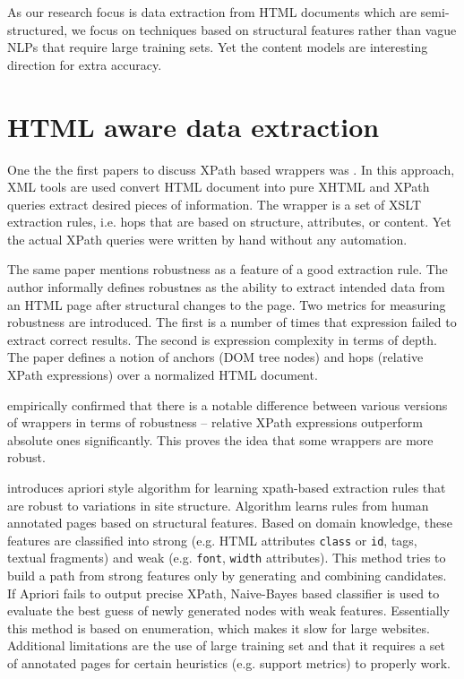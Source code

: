 As our research focus is data extraction from HTML documents which are semi-structured, we focus on techniques based on structural features rather than vague NLPs that require large training sets. Yet the content models are interesting direction for extra accuracy.


\section{HTML aware data extraction}

One the the first papers to discuss XPath based wrappers was \cite{Myllymaki02robustweb}. In this approach, XML tools are used convert HTML document into pure XHTML and XPath queries extract desired pieces of information. The wrapper is a set of XSLT extraction rules, i.e. hops that are based on structure, attributes, or content. Yet the actual XPath queries were written by hand without any automation.

The same paper mentions robustness as a feature of a good extraction rule. The author informally defines robustnes as the ability to extract intended data from an HTML page after structural changes to the page. Two metrics for measuring robustness are introduced. The first is a number of times that expression failed to extract correct results. The second is expression complexity in terms of depth. The paper defines a notion of anchors (DOM tree nodes) and hops (relative XPath expressions) over a normalized HTML document. 

\cite{Kowalkiewicz:2006:RWC:1135777.1135928} empirically confirmed that there is a notable difference between various versions of wrappers in terms of robustness – relative XPath expressions outperform absolute ones significantly. This proves the idea that some wrappers are more robust.

\cite{DBLP:conf/icde/GulhaneMMRRSSTT11} introduces apriori style algorithm for learning xpath-based extraction rules that are robust to variations in site structure. Algorithm learns rules from human annotated pages based on structural features. Based on domain knowledge, these features are classified into strong (e.g. HTML attributes \texttt{class} or \texttt{id}, tags, textual fragments) and weak (e.g. \texttt{font}, \texttt{width} attributes). This method tries to build a path from strong features only by generating and combining candidates. If Apriori fails to output precise XPath, Naive-Bayes based classifier is used to evaluate the best guess of newly generated nodes with weak features. Essentially this method is based on enumeration, which makes it slow for large websites. Additional limitations are the use of large training set and that it requires a set of annotated pages for certain heuristics (e.g. support metrics) to properly work. 

